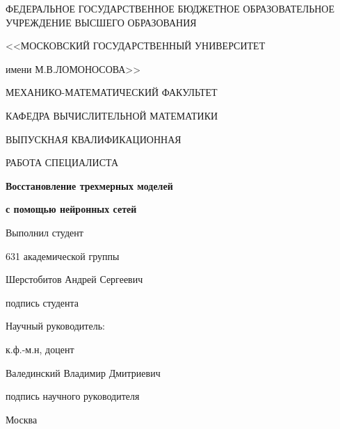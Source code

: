 \begin{titlepage}
  \begin{center}
    ФЕДЕРАЛЬНОЕ ГОСУДАРСТВЕННОЕ БЮДЖЕТНОЕ ОБРАЗОВАТЕЛЬНОЕ УЧРЕЖДЕНИЕ ВЫСШЕГО ОБРАЗОВАНИЯ

    <<МОСКОВСКИЙ ГОСУДАРСТВЕННЫЙ УНИВЕРСИТЕТ

    имени М.В.ЛОМОНОСОВА>>

    \vspace{0.7cm}

    МЕХАНИКО-МАТЕМАТИЧЕСКИЙ ФАКУЛЬТЕТ

    \vspace{0.7cm}

    КАФЕДРА ВЫЧИСЛИТЕЛЬНОЙ МАТЕМАТИКИ 

    \vspace{3cm}

    ВЫПУСКНАЯ КВАЛИФИКАЦИОННАЯ
		
		РАБОТА СПЕЦИАЛИСТА

    \vspace{0.7cm}

    \textbf{Восстановление трехмерных моделей}
		
		\textbf{с помощью нейронных сетей}

  \end{center}

  \vspace{2cm}

  \hfill
  \begin{minipage}{0.5\textwidth}
    Выполнил студент

    631 академической группы 

    Шерстобитов Андрей Сергеевич

    \vspace{1cm}

    \underline{\hspace{4cm}}

    подпись студента

    \vspace{0.5cm}

    Научный руководитель:

    к.ф.-м.н, доцент 

    Валединский Владимир Дмитриевич

    \vspace{1cm}

    \underline{\hspace{4cm}}

    подпись научного руководителя
 \end{minipage}

  \vfill

  \begin{center}
    \large Москва

    \the\year
  \end{center}

\end{titlepage}
